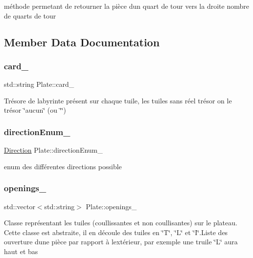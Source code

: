 méthode permetant de retourner la pièce d\textquotesingle{}un quart de tour vers la droite nombre de quarts de tour 

\subsection{Member Data Documentation}
\mbox{\label{class_plate_a9ee1e8fbce0414bd861cef599e98705e}} 
\subsubsection{\texorpdfstring{card\_}{card\_}}
{\footnotesize\ttfamily std\+::string Plate\+::card\+\_\+\hspace{0.3cm}{\ttfamily [protected]}}

Trésore de labyrinte présent sur chaque tuile, les tuiles sans réel trésor on le trésor \char`\"{}aucun\char`\"{} (ou \char`\"{}\char`\"{}) \mbox{\label{class_plate_abd3b1c8174eb9b7ddfcc4b65d0f58359}} 
\subsubsection{\texorpdfstring{directionEnum\_}{directionEnum\_}}
{\footnotesize\ttfamily \mbox{\hyperlink{class_direction}{Direction}} Plate\+::direction\+Enum\+\_\+\hspace{0.3cm}{\ttfamily [protected]}}

enum des différentes directions possible \mbox{\label{class_plate_a792f5bca5912b7eca3bc0a516cc87f75}} 
\subsubsection{\texorpdfstring{openings\_}{openings\_}}
{\footnotesize\ttfamily std\+::vector$<$std\+::string$>$ Plate\+::openings\+\_\+\hspace{0.3cm}{\ttfamily [protected]}}

Classe représentant les tuiles (coullissantes et non coullisantes) sur le plateau. Cette classe est abstraite, il en découle des tuiles en \char`\"{}\+T\char`\"{}, \char`\"{}\+L\char`\"{} et \char`\"{}\+I\char`\"{}.Liste des ouverture d\textquotesingle{}une pièce par rapport à l\textquotesingle{}extérieur, par exemple une truile \char`\"{}\+L\char`\"{} aura haut et bas \mbox{\label{class_plate_a0b1a00268147cb0285595d28ff4141a4}} 
